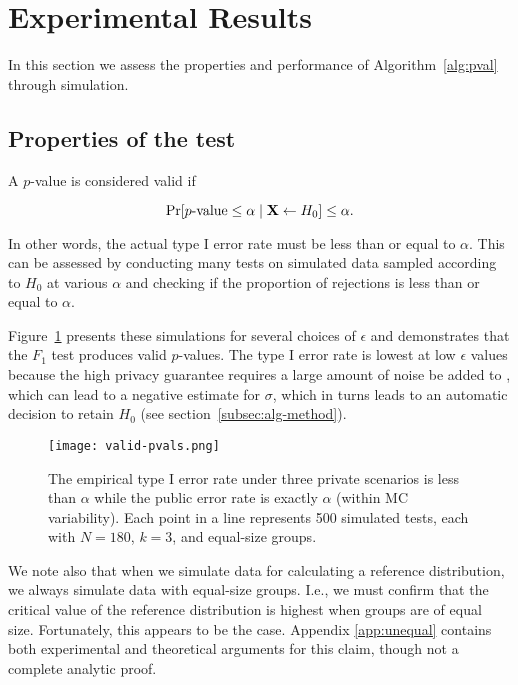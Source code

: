 \section{Experimental Results}
\label{sec:results}

In this section we assess the properties and performance of Algorithm~\ref{alg:pval} through simulation. 

\subsection{Properties of the test}\label{subsec:properties}

A $p$-value is considered valid if ~\cite{casellaberger2002}

$$
\Pr[p\textrm{-value} \le \alpha \mid \mathbf{X} \leftarrow H_0] \le \alpha.
$$

In other words, the actual type I error rate must be less than or equal to $\alpha$. This can be assessed by conducting many tests on simulated data sampled according to $H_0$ at various $\alpha$ and checking if the proportion of rejections is less than or equal to $\alpha$. 

Figure~\ref{Fig:valid-pvals} presents these simulations for several choices of $\epsilon$ and demonstrates that the $F_1$ test produces valid $p$-values. The type I error rate is lowest at low $\epsilon$ values because the high privacy guarantee requires a large amount of noise be added to \se, which can lead to a negative estimate for $\sigma$, which in turns leads to an automatic decision to retain $H_0$ (see section~\ref{subsec:alg-method}).

\begin{figure}
\centering
\texttt{[image: valid-pvals.png]}
\caption{The empirical type I error rate under three private scenarios is less than $\alpha$ while the public error rate is exactly $\alpha$ (within MC variability). Each point in a line represents 500 simulated tests, each with $N = 180$, $k=3$, and equal-size groups.\label{Fig:valid-pvals}}
\end{figure}

We note also that when we simulate data for calculating a reference distribution, we always simulate data with equal-size groups.  I.e., we must confirm that the critical value of the reference distribution is highest when groups are of equal size.  Fortunately, this appears to be the case.  Appendix \ref{app:unequal} contains both experimental and theoretical arguments for this claim, though not a complete analytic proof.

